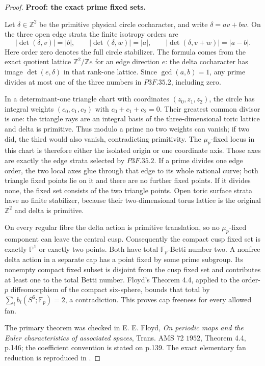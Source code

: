 \begin{proof}
\textbf{Proof: the exact prime fixed sets.}

Let \(\delta\in\mathbb Z^2\) be the primitive physical circle cocharacter, and write \(\delta=a v+b w\). On the three open edge strata the finite isotropy orders are \[
 |\det(\delta,v)|=|b|,\qquad
 |\det(\delta,w)|=|a|,\qquad
 |\det(\delta,v+w)|=|a-b|.                              \tag{P3F.35.2}
\] Here order zero denotes the full circle stabilizer. The formula comes from the exact quotient lattice \(\mathbb Z^2/\mathbb Z e\) for an edge direction \(e\): the delta cocharacter has image \(\det(e,\delta)\) in that rank-one lattice. Since \(\gcd(a,b)=1\), any prime divides at most one of the three numbers in \(P3F.35.2\), including zero.

In a determinant-one triangle chart with coordinates \((z_0,z_1,z_2)\), the circle has integral weights \((c_0,c_1,c_2)\) with \(c_0+c_1+c_2=0\). Their greatest common divisor is one: the triangle rays are an integral basis of the three-dimensional toric lattice and delta is primitive. Thus modulo a prime no two weights can vanish; if two did, the third would also vanish, contradicting primitivity. The \(\mu_p\)-fixed locus in this chart is therefore either the isolated origin or one coordinate axis. Those axes are exactly the edge strata selected by \(P3F.35.2\). If a prime divides one edge order, the two local axes glue through that edge to its whole rational curve; both triangle fixed points lie on it and there are no further fixed points. If it divides none, the fixed set consists of the two triangle points. Open toric surface strata have no finite stabilizer, because their two-dimensional torus lattice is the original \(\mathbb Z^2\) and delta is primitive.

On every regular fibre the delta action is primitive translation, so no \(\mu_p\)-fixed component can leave the central cusp. Consequently the compact cusp fixed set is exactly \(\mathbb P^1\) or exactly two points. Both have total \(\mathbb F_p\)-Betti number two. A nonfree delta action in a separate cap has a point fixed by some prime subgroup. Its nonempty compact fixed subset is disjoint from the cusp fixed set and contributes at least one to the total Betti number. Floyd's Theorem 4.4, applied to the order-\(p\) diffeomorphism of the compact six-sphere, bounds that total by \(\sum_i b_i(S^6;\mathbb F_p)=2\), a contradiction. This proves cap freeness for every allowed fan.

The primary theorem was checked in E. E. Floyd, \emph{On periodic maps and the Euler characteristics of associated spaces}, Trans. AMS 72 \(1952\), Theorem 4.4, p.146; the coefficient convention is stated on p.139. The exact elementary fan reduction is reproduced in .
\end{proof}
